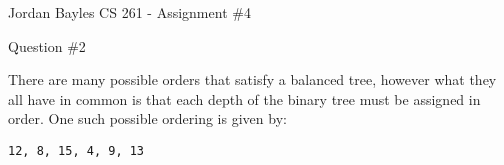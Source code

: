 \documentclass[12pt,letterpaper]{article}
\author{Jordan Bayles}
\title{}
\begin{document}

\begin{flushright}
Jordan Bayles
CS 261 - Assignment \#4
\end{flushright}

\begin{center}
Question \#2
\end{center}

There are many possible orders that satisfy a balanced tree, however what they
all have in common is that each depth of the binary tree must be assigned in
order. One such possible ordering is given by:

\begin{verbatim}
12, 8, 15, 4, 9, 13
\end{verbatim}
\end{document}
